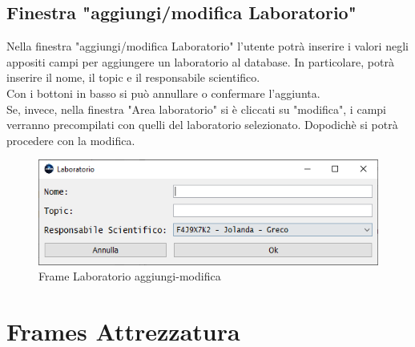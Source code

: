         \subsection {Finestra "aggiungi/modifica Laboratorio"}
            Nella finestra "aggiungi/modifica Laboratorio" l'utente potrà inserire i valori negli appositi campi per aggiungere un laboratorio al database. In particolare, potrà inserire il nome, il topic e il responsabile scientifico.\\
            Con i bottoni in basso si può annullare o confermare l'aggiunta.\\
            Se, invece, nella finestra "Area laboratorio" si è cliccati su "modifica", i campi verranno precompilati con quelli del laboratorio selezionato. Dopodichè si potrà procedere con la modifica.
            \begin{figure}[htbp!]
                \centering
                    \vspace{2\baselineskip}
                    \includegraphics[width=0.7\linewidth]{Immagini/Frames/Frame aggiungi-modifica/Frame Laboratorio aggiungi-modifica.png}
                \caption{Frame Laboratorio aggiungi-modifica}
                \label{fig:Frame Laboratorio aggiungi-modifica}
            \end{figure}

    \newpage

    \section{Frames Attrezzatura}
